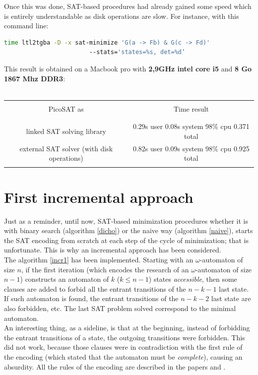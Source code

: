 Once this was done, SAT-based procedures had already gained some speed which is entirely understandable as
disk operations are slow. For instance, with this command
line:
\begin{lstlisting}[language=bash,caption={bash command-line to test a formula minimization using ltl2tgba}]
  time ltl2tgba -D -x sat-minimize 'G(a -> Fb) & G(c -> Fd)'
                        --stats='states=%s, det=%d’
\end{lstlisting}
This result is obtained on a Macbook pro with \textbf{2,9GHz intel core i5} and
\textbf{8 Go 1867 Mhz DDR3}:\\\\
\begin{tabular}{|c|c|}
 \hline
 &\\
 PicoSAT as & Time result\\
 &\\
 \hline
 &\\
 linked SAT solving library&0.29s user 0.08s system 98\% cpu 0.371 total\\
 external SAT solver (with disk operations)&0.82s user 0.09s system 98\% cpu 0.925 total\\
 &\\
 \hline
\end{tabular}

\section{First incremental approach}
Just as a reminder, until now, SAT-based minimization procedures whether it is with binary search
(algorithm \ref{dicho}) or the naive way (algorithm \ref{naive}), starts the SAT encoding from scratch
at each step of the cycle of minimization; that is unfortunate. This is why an incremental approach
has been considered.\\

\noindent  The algorithm \ref{incr1} has been implemented. Starting with an $\omega$-automaton of size
$n$, if the first iteration (which encodes the research of an $\omega$-automaton of size $n-1$) constructs
an automaton of $k$ ($k \leq n-1$) states \textit{accessible}, then some clauses are added to forbid all the
entrant transitions of the $n-k-1$ last state. If such automaton is found, the entrant transitions of the
$n-k-2$ last state are also forbidden, etc. The last SAT problem solved correspond to the minimal
automaton.\\

\noindent An interesting thing, as a sideline, is that at the beginning, instead of forbidding the entrant
transitions of a state, the outgoing transitions were forbidden. This did not work, because those
clauses were in contradiction with the first rule of the encoding (which stated that the automaton must be
\textit{complete}), causing an absurdity. All the rules of the encoding are described in the papers
\cite{14} and \cite{15}.\\

